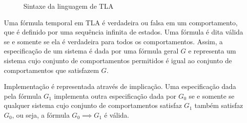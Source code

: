\begin{figure}[h]
  \centering
  \caption{Sintaxe da linguagem de TLA}
\label{fig:sintaxe-tla}
\end{figure}

Uma fórmula temporal em TLA é verdadeira ou falsa em um comportamento, que é definido por uma sequência infinita de estados. Uma fórmula é dita válida se e somente se ela é verdadeira para todos os comportamentos. Assim, a especificação de um sistema é dada por uma fórmula geral $G$ e representa um sistema cujo conjunto de comportamentos permitidos é igual ao conjunto de comportamentos que satisfazem $G$.

Implementação é representada através de implicação. Uma especificação dada pela fórmula $G_1$ implementa outra especificação dada por $G_0$ se e somente se qualquer sistema cujo conjunto de comportamentos satisfaz $G_1$ também satisfaz $G_0$, ou seja, a fórmula $G_0 \implies G_1$ é válida.

